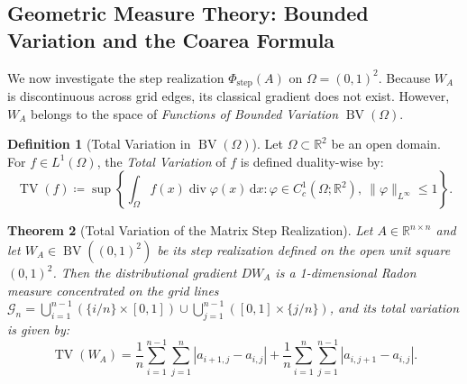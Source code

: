 \documentclass[11pt,a4paper,reqno]{amsart}
\newtheorem{theorem}{Theorem}[section]
\theoremstyle{definition}
\newtheorem{definition}[theorem]{Definition}
\numberwithin{equation}{section}
\providecommand{\R}{\mathbb{R}}
\providecommand{\BV}{\operatorname{BV}}
\providecommand{\TV}{\operatorname{TV}}
\newcommand{\dif}{\,\mathrm{d}}
\providecommand{\R}{\mathbb{R}}
\providecommand{\BV}{\mathrm{BV}}
\providecommand{\TV}{\mathrm{TV}}
\begin{document}
\subsection{Geometric Measure Theory: Bounded Variation and the Coarea Formula}
\label{subsec:coarea}

We now investigate the step realization $\Phi_{\mathrm{step}}(A)$ on $\Omega = (0, 1)^2$. Because $W_A$ is discontinuous across grid edges, its classical gradient does not exist. However, $W_A$ belongs to the space of \emph{Functions of Bounded Variation} $\BV(\Omega)$.

\begin{definition}[Total Variation in $\BV(\Omega)$]
Let $\Omega \subset \R^2$ be an open domain. For $f \in L^1(\Omega)$, the \emph{Total Variation} of $f$ is defined duality-wise by:
\begin{equation}
    \TV(f) \coloneqq \sup \left\{ \int_\Omega f(x) \operatorname{div} \varphi(x) \dif x \colon \varphi \in C_c^1(\Omega; \R^2), \ \|\varphi\|_{L^\infty} \le 1 \right\}.
\end{equation}
\end{definition}

\begin{theorem}[Total Variation of the Matrix Step Realization]
\label{thm:tv_matrix}
Let $A \in \R^{n \times n}$ and let $W_A \in \BV((0,1)^2)$ be its step realization defined on the open unit square $(0, 1)^2$. Then the distributional gradient $D W_A$ is a 1-dimensional Radon measure concentrated on the grid lines $\mathcal{G}_n = \bigcup_{i=1}^{n-1} (\{i/n\} \times [0,1]) \cup \bigcup_{j=1}^{n-1} ([0,1] \times \{j/n\})$, and its total variation is given by:
\begin{equation}
    \label{eq:tv_formula}
    \TV(W_A) = \frac{1}{n} \sum_{i=1}^{n-1} \sum_{j=1}^n |a_{i+1, j} - a_{i, j}| + \frac{1}{n} \sum_{i=1}^n \sum_{j=1}^{n-1} |a_{i, j+1} - a_{i, j}|.
\end{equation}
\end{theorem}
\end{document}
